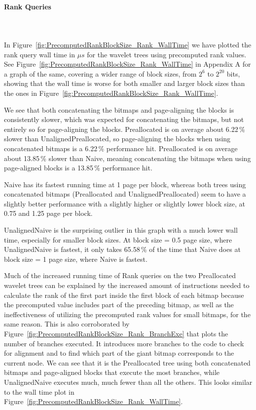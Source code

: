 \paragraph{Rank Queries}~\\\\
In Figure~\ref{fig:PrecomputedRankBlockSize_Rank_WallTime} we have plotted the rank query wall time in $\mu s$ for the wavelet trees using precomputed rank values.
See Figure~\ref{fig:PrecomputedRankBlockSize_Rank_WallTime} in Appendix A for a graph of the same, covering a wider range of block sizes, from $2^{6}$ to $2^{20}$ bits, showing that the wall time is worse for both smaller and larger block sizes than the ones in Figure~\ref{fig:PrecomputedRankBlockSize_Rank_WallTime}.

We see that both concatenating the bitmaps and page-aligning the blocks is consistently slower, which was expected for concatenating the bitmaps, but not entirely so for page-aligning the blocks.
Preallocated is on average about 6.22\,\% slower than UnalignedPreallocated, so page-aligning the blocks when using concatenated bitmaps is a 6.22\,\% performance hit.
Preallocated is on average about 13.85\,\% slower than Naive, meaning concatenating the bitmaps when using page-aligned blocks is a 13.85\,\% performance hit.

Naive has its fastest running time at 1 page per block, whereas both trees using concatenated bitmaps (Preallocated and UnalignedPreallocated) seem to have a slightly better performance with a slightly higher or slightly lower block size, at 0.75 and 1.25 page per block.

UnalignedNaive is the surprising outlier in this graph with a much lower wall time, especially for smaller block sizes.
At block size = 0.5 page size, where UnalignedNaive is fastest, it only takes 65.58\,\% of the time that Naive does at block size = 1 page size, where Naive is fastest.

Much of the increased running time of Rank queries on the two Preallocated wavelet trees can be explained by the increased amount of instructions needed to calculate the rank of the first part inside the first block of each bitmap because the precomputed value includes part of the preceding bitmap, as well as the ineffectiveness of utilizing the precomputed rank values for small bitmaps, for the same reason.
This is also corroborated by Figure~\ref{fig:PrecomputedRankBlockSize_Rank_BranchExe} that plots the number of branches executed.
It introduces more branches to the code to check for alignment and to find which part of the giant bitmap corresponds to the current node.
We can see that it is the Preallocated tree using both concatenated bitmaps and page-aligned blocks that execute the most branches, while UnalignedNaive executes much, much fewer than all the others.
This looks similar to the wall time plot in Figure~\ref{fig:PrecomputedRankBlockSize_Rank_WallTime}.

